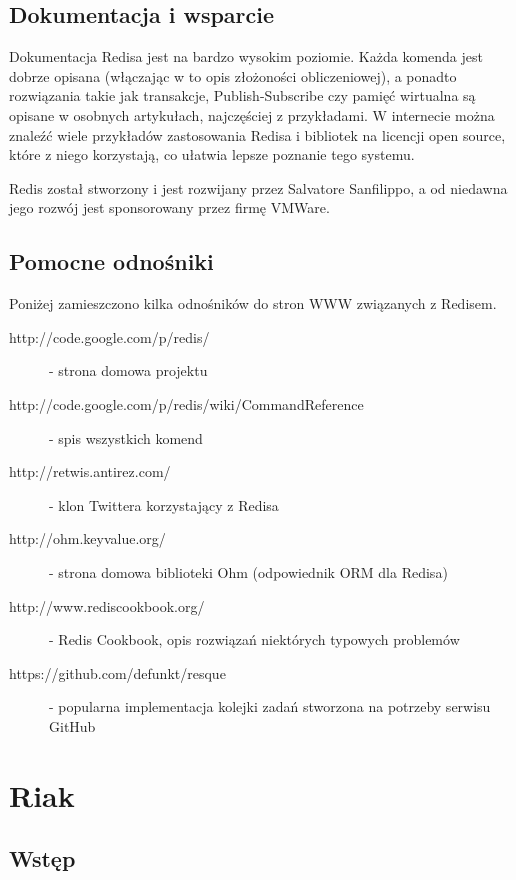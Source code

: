 \subsection*{Dokumentacja i wsparcie}

Dokumentacja Redisa jest na bardzo wysokim poziomie.
Każda komenda jest dobrze opisana (włączając w to opis złożoności obliczeniowej), a ponadto rozwiązania takie jak transakcje, Publish-Subscribe czy pamięć wirtualna są opisane w osobnych artykułach, najczęściej z przykładami.
W internecie można znaleźć wiele przykładów zastosowania Redisa i bibliotek na licencji open source, które z niego korzystają, co ułatwia lepsze poznanie tego systemu.

Redis został stworzony i jest rozwijany przez Salvatore Sanfilippo, a od niedawna jego rozwój jest sponsorowany przez firmę VMWare.

\subsection*{Pomocne odnośniki}
 
Poniżej zamieszczono kilka odnośników do stron WWW związanych z Redisem.

\begin{description}
 \item [http://code.google.com/p/redis/] - strona domowa projektu
 \item [http://code.google.com/p/redis/wiki/CommandReference] - spis wszystkich komend
 \item [http://retwis.antirez.com/] - klon Twittera korzystający z Redisa
 \item [http://ohm.keyvalue.org/] - strona domowa biblioteki Ohm (odpowiednik ORM dla Redisa)
 \item [http://www.rediscookbook.org/] - Redis Cookbook, opis rozwiązań niektórych typowych problemów
 \item [https://github.com/defunkt/resque] - popularna implementacja kolejki zadań stworzona na potrzeby serwisu GitHub
\end{description}

\section{Riak}
\label{sec:riak}

\subsection*{Wstęp} 

